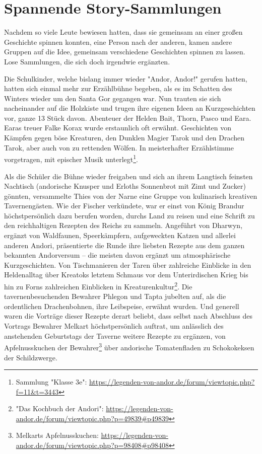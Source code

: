 \section{Spannende Story-Sammlungen}

Nachdem so viele Leute bewiesen hatten, dass sie gemeinsam an einer großen Geschichte spinnen konnten, eine Person nach der anderen, kamen andere Gruppen auf die Idee, gemeinsam verschiedene Geschichten spinnen zu lassen. Lose Sammlungen, die sich doch irgendwie ergänzten.

Die Schulkinder, welche bislang immer wieder "Andor, Andor!" gerufen hatten, hatten sich einmal mehr zur Erzählbühne begeben, als es im Schatten des Winters wieder um den Santa Gor gegangen war. Nun trauten sie sich nacheinander auf die Holzkiste und trugen ihre eigenen Ideen an Kurzgeschichten vor, ganze 13 Stück davon. Abenteuer der Helden Bait, Thorn, Pasco und Eara. Earas treuer Falke Korax wurde erstaunlich oft erwähnt. Geschichten von Kämpfen gegen böse Kreaturen, den Dunklen Magier Tarok und den Drachen Tarok, aber auch von zu rettenden Wölfen. In meisterhafter Erzählstimme vorgetragen, mit epischer Musik unterlegt\footnote{Sammlung "Klasse 3e": \url{https://legenden-von-andor.de/forum/viewtopic.php?f=11&t=3443}}. 

Als die Schüler die Bühne wieder freigaben und sich an ihrem Langtisch feinsten Nachtisch (andorische Knusper und Erloths Sonnenbrot mit Zimt und Zucker) gönnten, versammelte Thies von der Narne eine Gruppe von kulinarisch kreativen Tavernengästen. Wie der Fischer verkündete, war er einst von König Brandur höchstpersönlich dazu berufen worden, durchs Land zu reisen und eine Schrift zu den reichhaltigen Rezepten des Reichs zu sammeln. Angeführt von Dharwyn, ergänzt von Waldfaunen, Speerkämpfern, aufgeweckten Katzen und allerlei anderen Andori, präsentierte die Runde ihre liebsten Rezepte aus dem ganzen bekannten Andorversum  -- die meisten davon ergänzt um atmosphärische Kurzgeschichten. Von Tischmanieren der Taren über zahlreiche Einblicke in den Heldenalltag über Kreatoks letztem Schmaus vor dem Unterirdischen Krieg bis hin zu Forns zahlreichen Einblicken in Kreaturenkultur\footnote{"Das Kochbuch der Andori": \url{https://legenden-von-andor.de/forum/viewtopic.php?p=49839\#p49839}}. Die tavernenbesuchenden Bewahrer Phlegon und Tapta jubelten auf, als die ordentlichen Drachenbohnen, ihre Leibspeise, erwähnt wurden. Und generell waren die Vorträge dieser Rezepte derart beliebt, dass selbst nach Abschluss des Vortrags Bewahrer Melkart höchstpersönlich auftrat, um anlässlich des anstehenden Geburtstags der Taverne weitere Rezepte zu ergänzen, von Apfelnusskuchen der Bewahrer\footnote{Melkarts Apfelnusskuchen: \url{https://legenden-von-andor.de/forum/viewtopic.php?p=98408\#p98408}} über andorische Tomatenfladen zu Schokokeksen der Schildzwerge. 


